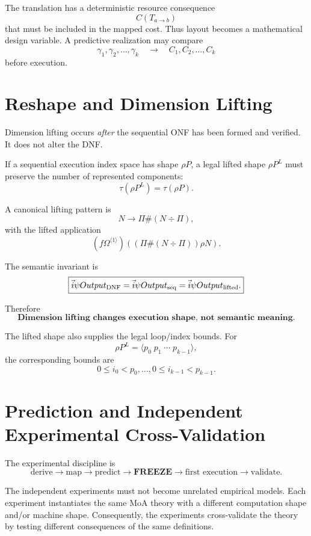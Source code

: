 \documentclass[11pt]{article}
\newcommand{\DNF}{\mathrm{DNF}}
\begin{document}
The translation has a deterministic resource consequence
\[
\boxed{C(T_{a\rightarrow b})}
\]
that must be included in the mapped cost.  Thus layout becomes a mathematical design variable.
A predictive realization may compare
\[
\gamma_1,\gamma_2,\ldots,\gamma_k
\quad\longrightarrow\quad
C_1,C_2,\ldots,C_k
\]
before execution.

\section{Reshape and Dimension Lifting}

Dimension lifting occurs \emph{after} the sequential ONF has been formed and verified.  It does
not alter the DNF.

If a sequential execution index space has shape \(\rho P\), a legal lifted shape
\(\rho P^L\) must preserve the number of represented components:
\[
\boxed{\tau(\rho P^L)=\tau(\rho P).}
\]

A canonical lifting pattern is
\[
\boxed{N\rightarrow \Pi\#(N\div\Pi),}
\]
with the lifted application
\[
\boxed{
(f\Omega^{\langle1\rangle})
\left(
(\Pi\#(N\div\Pi))\rho N
\right).
}
\]

The semantic invariant is
\[
\boxed{
\vec i\psi Output_{\DNF}
=
\vec i\psi Output_{\rm seq}
=
\vec i\psi Output_{\rm lifted}.
}
\]

Therefore
\[
\boxed{\textbf{Dimension lifting changes execution shape, not semantic meaning.}}
\]

The lifted shape also supplies the legal loop/index bounds.  For
\[
\rho P^L=\langle p_0\;p_1\;\cdots\;p_{k-1}\rangle,
\]
the corresponding bounds are
\[
0\le i_0<p_0,\ldots,0\le i_{k-1}<p_{k-1}.
\]

\section{Prediction and Independent Experimental Cross-Validation}

The experimental discipline is
\[
\boxed{
\text{derive}
\rightarrow
\text{map}
\rightarrow
\text{predict}
\rightarrow
\textbf{FREEZE}
\rightarrow
\text{first execution}
\rightarrow
\text{validate}.
}
\]

The independent experiments must not become unrelated empirical models.  Each experiment
instantiates the same MoA theory with a different computation shape and/or machine shape.
Consequently, the experiments cross-validate the theory by testing different consequences of the
same definitions.
\end{document}
